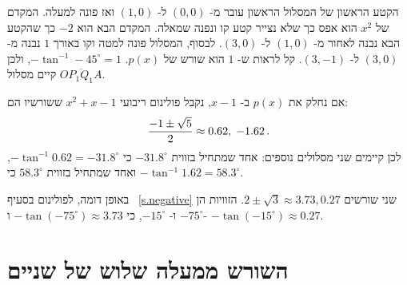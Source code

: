 \begin{center}
\end{center}


הקטע הראשון של המסלול הראשון עובר מ-%
$(0,0)$
ל-%
$(1,0)$
ואז פונה למעלה. המקדם של
$x^2$
הוא אפס כך שלא נצייר קטע קו ונפנה שמאלה. המקדם הבא הוא
$-2$
כך שהקטע הבא נבנה לאחור מ-%
$(1,0)$
ל-%
$(3,0)$.
לבסוף, המסלול פונה למטה וקו באורך 
$1$
נבנה מ-%
$(3,0)$
ל-%
$(3,-1)$.
קל לראות ש-%
$1$
הוא שורש של
$p(x)$.
$-\tan^{-1} -45^\circ=1$,
ולכן קיים מסלול
$\overline{OP_1Q_1A}$.

אם נחלק את
$p(x)$
ב-%
$x-1$,
נקבל פולינום ריבועי
$x^2+x-1$
ששורשיו הם:
\[
\displaystyle\frac{-1\pm\sqrt{5}}{2} \approx 0.62,\; -1.62\,.
\]
לכן קיימים שני מסלולים נוספים: אחד שמתחיל בזווית
$-31.8^\circ$
כי
$-\tan^{-1} 0.62=-31.8^\circ$,
ואחד שמתחיל בזווית
$58.3^\circ$
כי
$-\tan^{-1}1.62=58.3^\circ$.

באופן דומה, לפולינום בסעיף%
~\ref{s.negative}
שני שורשים
$ 2\pm\sqrt{3}\approx 3.73, 0.27$.
הזוויות הן
$-75^\circ$
ו-%
$-15^\circ$,
כי
$-\tan (-75^\circ)\approx 3.73$ 
ו-%
$-\tan (-15^\circ)\approx 0.27$.



\section{השורש ממעלה שלוש של שניים}\label{s.cube-root}

